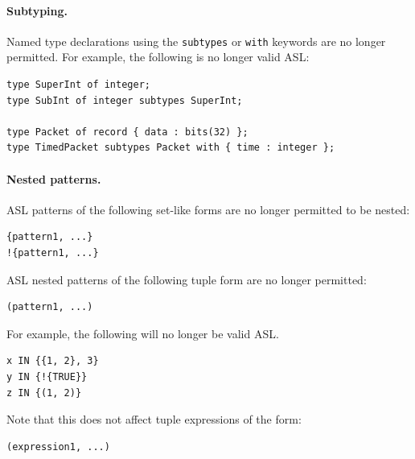 \paragraph{Subtyping.}

Named type declarations using the \lstinline{subtypes} or \lstinline{with} keywords are no longer permitted.
For example, the following is no longer valid ASL:
\begin{lstlisting}
type SuperInt of integer;
type SubInt of integer subtypes SuperInt;

type Packet of record { data : bits(32) };
type TimedPacket subtypes Packet with { time : integer };
\end{lstlisting}

\paragraph{Nested patterns.}

ASL patterns of the following set-like forms are no longer permitted to be nested:
\begin{lstlisting}
{pattern1, ...}
!{pattern1, ...}
\end{lstlisting}
ASL nested patterns of the following tuple form are no longer permitted:
\begin{lstlisting}
(pattern1, ...)
\end{lstlisting}
For example, the following will no longer be valid ASL.
\begin{lstlisting}
x IN {{1, 2}, 3}
y IN {!{TRUE}}
z IN {(1, 2)}
\end{lstlisting}
Note that this does not affect tuple expressions of the form:
\begin{lstlisting}
(expression1, ...)
\end{lstlisting}
